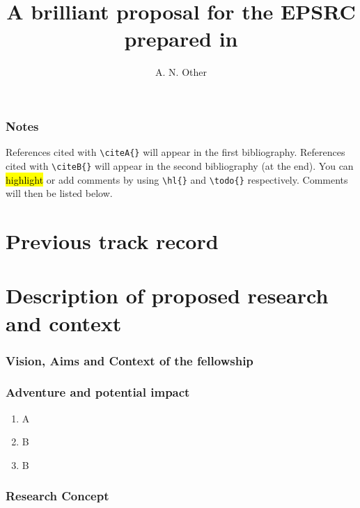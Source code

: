 \documentclass{epsrc}
\begin{document}
\section{Notes}
References cited with \verb|\citeA{}| will appear in the first bibliography.
References cited with \verb|\citeB{}| will appear in the second bibliography (at the end).
You can \hl{highlight} or add comments  by using \verb|\hl{}| and \verb|\todo{}| respectively.
Comments will then be listed below.


\listoftodos%
\newpage%
\title{A brilliant proposal for the EPSRC prepared in \LaTeXe}
\author{A. N. Other}
\maketitle

\part{Previous track record}


\lipsum[1-14]

\newpage

\part{Description of proposed research and context}

\section{Vision, Aims and Context of the fellowship}

\lipsum[15-16]

\section{Adventure and potential impact}

\lipsum[17-18]

\begin{enumerate}[label=\roman*.]
	\item A
	\item B
	\item B
\end{enumerate}

\section{Research Concept}
\end{document}
